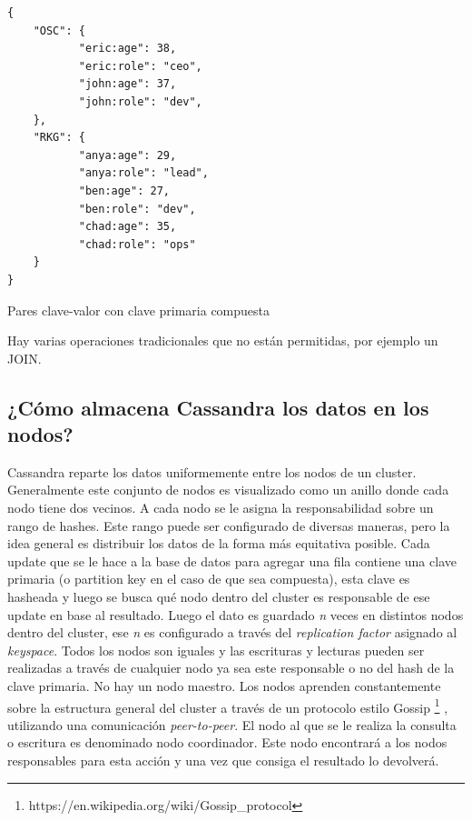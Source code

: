 \documentclass[11pt,a4paper]{article}
\begin{document}
\begin{listing}
\begin{verbatim}
{
	"OSC": {
           "eric:age": 38,
		   "eric:role": "ceo",
		   "john:age": 37,
		   "john:role": "dev",
    },
    "RKG": {
           "anya:age": 29,
		   "anya:role": "lead",
		   "ben:age": 27,
		   "ben:role": "dev",
		   "chad:age": 35,
		   "chad:role": "ops"
    }
}
\end{verbatim}
\caption{Pares clave-valor con clave primaria compuesta} 
\label{json-example}
\end{listing}

Hay varias operaciones tradicionales que no están permitidas, por ejemplo un JOIN.

\subsection{¿Cómo almacena Cassandra los datos en los nodos?}
Cassandra reparte los datos uniformemente entre los nodos de un cluster. Generalmente este conjunto de nodos es visualizado como un anillo donde cada nodo tiene dos vecinos. A cada nodo se le asigna la responsabilidad sobre un rango de hashes. Este rango puede ser configurado de diversas maneras, pero la idea general es distribuir los datos de la forma más equitativa posible. Cada update que se le hace a la base de datos para agregar una fila contiene una clave primaria (o partition key en el caso de que sea compuesta), esta clave es hasheada y luego se busca qué nodo dentro del cluster es responsable de ese update en base al resultado. Luego el dato es guardado \textit{n} veces en distintos nodos dentro del cluster, ese \textit{n} es configurado a través del \textit{replication factor} asignado al \textit{keyspace}. Todos los nodos son iguales y las escrituras y lecturas pueden ser realizadas a través de cualquier nodo ya sea este responsable o no del hash de la clave primaria. No hay un nodo maestro. Los nodos aprenden constantemente sobre la estructura general del cluster a través de un protocolo estilo Gossip \footnote{ https://en.wikipedia.org/wiki/Gossip\_protocol } , utilizando una comunicación \textit{peer-to-peer}. El nodo al que se le realiza la consulta o escritura es denominado nodo coordinador. Este nodo encontrará a los nodos responsables para esta acción y una vez que consiga el resultado lo devolverá. \\
\end{document}
